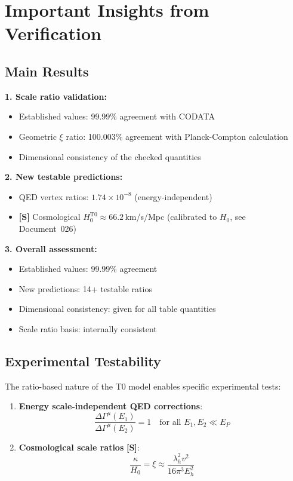 	\section{Important Insights from Verification}
	
	\subsection{Main Results}
	
	\begin{tcolorbox}[colback=green!5!white,colframe=green!75!black,title=Main Results of T0 Verification]
		\textbf{1. Scale ratio validation:}
		\begin{itemize}
			\item Established values: 99.99\% agreement with CODATA
			\item Geometric $\xi$ ratio: 100.003\% agreement with Planck-Compton calculation
			\item Dimensional consistency of the checked quantities
		\end{itemize}
		
		\textbf{2. New testable predictions:}
		\begin{itemize}
			\item QED vertex ratios: $1.74 \times 10^{-8}$ (energy-independent)
			\item \textbf{[S]} Cosmological $H_0^{\text{T0}} \approx 66.2\,$km/s/Mpc (calibrated to $H_0$, see Document~026)
		\end{itemize}
		
		\textbf{3. Overall assessment:}
		\begin{itemize}
			\item Established values: 99.99\% agreement
			\item New predictions: 14+ testable ratios
			\item Dimensional consistency: given for all table quantities
			\item Scale ratio basis: internally consistent
		\end{itemize}
	\end{tcolorbox}
	
	\subsection{Experimental Testability}
	
	The ratio-based nature of the T0 model enables specific experimental tests:
	
	\begin{enumerate}
		\item \textbf{Energy scale-independent QED corrections}:
		\begin{equation}
			\frac{\Delta\Gamma^{\mu}(E_1)}{\Delta\Gamma^{\mu}(E_2)} = 1 \quad \text{for all } E_1, E_2 \ll E_P
		\end{equation}
		
		\item \textbf{Cosmological scale ratios} \textbf{[S]}:
		\begin{equation}
			\frac{\kappa}{H_0} = \xi \approx \frac{\lambda_h^2 v^2}{16\pi^3 E_h^2}
		\end{equation}
	\end{enumerate}
	
